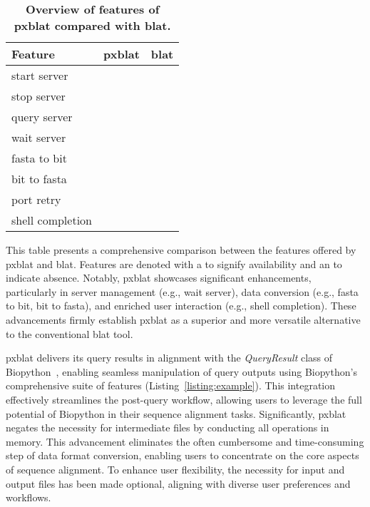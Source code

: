 \documentclass[10pt,letterpaper]{article}
\newcommand{\cmark}{\ding{51}}%
\newcommand{\xmark}{\ding{55}}%
\begin{document}
\begin{table}[!ht]
	\centering
	\caption{{\bf Overview of features of \gls{pxblat} compared with \gls{blat}.}}\label{tab:apicmp}
	\begin{tabular}{@{}lll@{}}
		\toprule
		Feature          & \gls{pxblat} & \gls{blat} \\ \midrule
		start server     & \cmark{}     & \cmark{}   \\
		stop  server     & \cmark{}     & \cmark{}   \\
		query server     & \cmark{}     & \cmark{}   \\
		wait server      & \cmark{}     & \xmark{}   \\
		fasta to bit     & \cmark{}     & \xmark{}   \\
		bit to fasta     & \cmark{}     & \xmark{}   \\
		port retry       & \cmark{}     & \xmark{}   \\
		shell completion & \cmark{}     & \xmark{}   \\
		\bottomrule
	\end{tabular}
	\begin{flushleft}
		This table presents a comprehensive comparison between the features offered by \gls{pxblat} and \gls{blat}.
		Features are denoted with a \cmark{} to signify availability and an \xmark{} to indicate absence.
		Notably, \gls{pxblat} showcases significant enhancements, particularly in server management (e.g., wait server), data conversion (e.g., fasta to bit, bit to fasta), and enriched user interaction (e.g., shell completion).
		These advancements firmly establish \gls{pxblat} as a superior and more versatile alternative to the conventional \gls{blat} tool.
	\end{flushleft}
\end{table}

\gls{pxblat} delivers its query results in alignment with the \emph{QueryResult} class of Biopython~\cite{cock2009biopython}, enabling seamless manipulation of query outputs using Biopython's comprehensive suite of features (Listing~\ref{listing:example}).
This integration effectively streamlines the post-query workflow, allowing users to leverage the full potential of Biopython in their sequence alignment tasks.
Significantly, \gls{pxblat} negates the necessity for intermediate files by conducting all operations in memory.
This advancement eliminates the often cumbersome and time-consuming step of data format conversion, enabling users to concentrate on the core aspects of sequence alignment.
To enhance user flexibility, the necessity for input and output files has been made optional, aligning with diverse user preferences and workflows.
\end{document}
